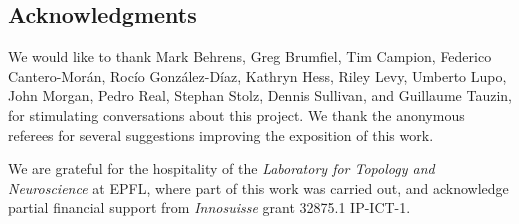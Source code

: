 
\subsection*{Acknowledgments}

We would like to thank Mark Behrens, Greg Brumfiel, Tim Campion, Federico Cantero-Mor\'an, Roc\'io Gonz\'alez-D\'iaz, Kathryn Hess, Riley Levy, Umberto Lupo, John Morgan, Pedro Real, Stephan Stolz, Dennis Sullivan, and Guillaume Tauzin, for stimulating conversations about this project.
We thank the anonymous referees for several suggestions improving the exposition of this work.

We are grateful for the hospitality of the \textit{Laboratory for Topology and Neuroscience} at EPFL, where part of this work was carried out, and acknowledge partial financial support from \textit{Innosuisse} grant 32875.1 IP-ICT-1.